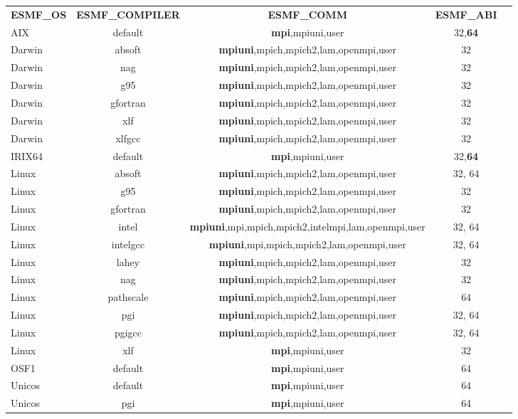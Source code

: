\vspace{1ex}


\begin{tabular}{lcccc}
  {\bfseries ESMF\_OS} &{\bfseries ESMF\_COMPILER} & {\bfseries ESMF\_COMM} & {\bfseries ESMF\_ABI} \\

AIX     &  default      &  {\bf mpi},mpiuni,user         &  32,{\bf 64}  \\
Darwin  &  absoft       &  {\bf mpiuni},mpich,mpich2,lam,openmpi,user  &  32  \\
Darwin  &  nag          &  {\bf mpiuni},mpich,mpich2,lam,openmpi,user  &  32  \\
Darwin  &  g95          &  {\bf mpiuni},mpich,mpich2,lam,openmpi,user  &  32  \\
Darwin  &  gfortran     &  {\bf mpiuni},mpich,mpich2,lam,openmpi,user  &  32  \\
Darwin  &  xlf          &  {\bf mpiuni},mpich,mpich2,lam,openmpi,user  &  32  \\
Darwin  &  xlfgcc       &  {\bf mpiuni},mpich,mpich2,lam,openmpi,user  &  32  \\
IRIX64  &  default      &  {\bf mpi},mpiuni,user         &  32,{\bf 64}  \\
Linux   &  absoft       &  {\bf mpiuni},mpich,mpich2,lam,openmpi,user  &  32, 64 \\
Linux   &  g95          &  {\bf mpiuni},mpich,mpich2,lam,openmpi,user  &  32  \\
Linux   &  gfortran     &  {\bf mpiuni},mpich,mpich2,lam,openmpi,user  &  32  \\
Linux   &  intel        &  {\bf mpiuni},mpi,mpich,mpich2,intelmpi,lam,openmpi,user  &  32, 64 \\
Linux   &  intelgcc     &  {\bf mpiuni},mpi,mpich,mpich2,lam,openmpi,user  &  32, 64 \\
Linux   &  lahey        &  {\bf mpiuni},mpich,mpich2,lam,openmpi,user  &  32  \\
Linux   &  nag          &  {\bf mpiuni},mpich,mpich2,lam,openmpi,user  &  32  \\
Linux   &  pathscale    &  {\bf mpiuni},mpich,mpich2,lam,openmpi,user  &  64  \\
Linux   &  pgi          &  {\bf mpiuni},mpich,mpich2,lam,openmpi,user  &  32, 64  \\
Linux   &  pgigcc       &  {\bf mpiuni},mpich,mpich2,lam,openmpi,user  &  32, 64  \\
Linux   &  xlf          &  {\bf mpi},mpiuni,user         &  32  \\
OSF1    &  default      &  {\bf mpi},mpiuni,user         &  64  \\
Unicos  &  default      &  {\bf mpi},mpiuni,user         &  64  \\
Unicos  &  pgi          &  {\bf mpi},mpiuni,user         &  64

\end{tabular}

\vspace{1ex}

